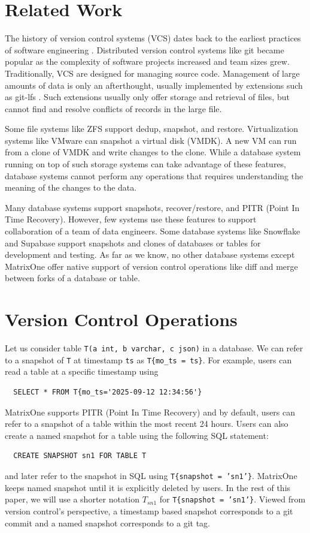 \documentclass[sigconf,nonacm]{acmart} %
\begin{document}
\section{Related Work}\label{sec:related}
The history of version control systems (VCS) dates back to the earliest practices of 
software engineering \cite{SCCS}\cite{RCS}\cite{CVS}.  Distributed version control 
systems like git \cite{Git} became popular as the complexity of software
projects increased and team sizes grew.  Traditionally, VCS are designed for managing 
source code.  Management of large amounts of data is only an afterthought, usually implemented
by extensions such as git-lfs \cite{GitLFS}.  Such extensions usually only offer storage 
and retrieval of files, but cannot find and resolve conflicts of records in the large file.

Some file systems like ZFS \cite{ZFS} support dedup, snapshot, and restore.
Virtualization systems like VMware can snapshot a virtual disk (VMDK)\cite{VMDK}.
A new VM can run from a clone of VMDK and write changes to the clone.  While a database
system running on top of such storage systems can take advantage of these features,
database systems cannot perform any operations that requires understanding the 
meaning of the changes to the data.

Many database systems support snapshots, recover/restore, and 
PITR (Point In Time Recovery).  However, few systems use these features
to support collaboration of a team of data engineers.  Some database
systems like Snowflake \cite{Snowflake} and Supabase \cite{Supabase} 
support snapshots and clones of databases or tables for development
and testing.  As far as we know, no other database systems except 
MatrixOne offer native support of version control operations like 
diff and merge between forks of a database or table.

\section{Version Control Operations}\label{sec:vcop}
Let us consider table \texttt{T(a int, b varchar, c json)} in a database.  
We can refer to a snapshot of \texttt{T} at timestamp
\texttt{ts} as \texttt{T\{mo\_ts = ts\}}.  For example, users can read a table 
at a specific timestamp using 
\begin{verbatim}
  SELECT * FROM T{mo_ts='2025-09-12 12:34:56'}
\end{verbatim}
MatrixOne supports PITR (Point In Time Recovery) and by default, users can refer
to a snapshot of a table within the most recent 24 hours.  Users can also 
create a named snapshot for a table using the following SQL statement:
\begin{verbatim}
  CREATE SNAPSHOT sn1 FOR TABLE T
\end{verbatim}  
and later refer to the snapshot in SQL using \texttt{T\{snapshot = 'sn1'\}}.  
MatrixOne keeps named snapshot until it is explicitly deleted by users.
In the rest of this paper, we will use a shorter notation 
$T_{sn1}$ for \texttt{T\{snapshot = 'sn1'\}}. 
Viewed from version control's perspective, a timestamp based snapshot
corresponds to a git commit and a named snapshot corresponds to a git tag.
\end{document}
